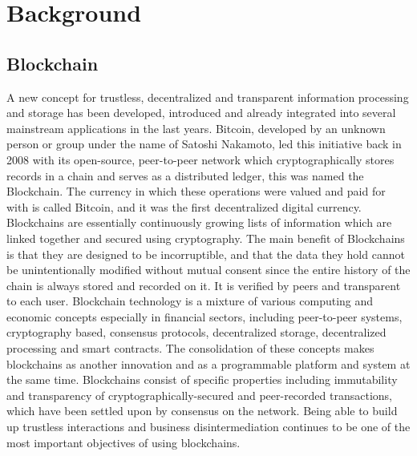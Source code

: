 \section{Background}

\subsection{Blockchain}

A new concept for trustless, decentralized and transparent information processing and storage has been developed, introduced and already integrated into several mainstream applications in the last years. Bitcoin, developed by an unknown person or group under the name of Satoshi Nakamoto, led this initiative back in 2008 with its open-source, peer-to-peer network which cryptographically stores records in a chain and serves as a distributed ledger, this was named the Blockchain. The currency in which these operations were valued and paid for with is called Bitcoin, and it was the first decentralized digital currency.
Blockchains are essentially continuously growing lists of information which are linked together and secured using cryptography. The main benefit of Blockchains is that they are designed to be incorruptible, and that the data they hold cannot be unintentionally modified without mutual consent since the entire history of the chain is always stored and recorded on it. It is verified by peers and transparent to each user.
Blockchain technology is a mixture of various computing and economic concepts especially in financial sectors, including peer-to-peer systems, cryptography based, consensus protocols, decentralized storage, decentralized processing and smart contracts. The consolidation of these concepts makes blockchains as another innovation and as a programmable platform and system at the same time. Blockchains consist of specific properties including immutability and transparency of cryptographically-secured and peer-recorded transactions, which have been settled upon by consensus on the network. Being able to build up trustless interactions and business disintermediation continues to be one of the most important objectives of using blockchains.

